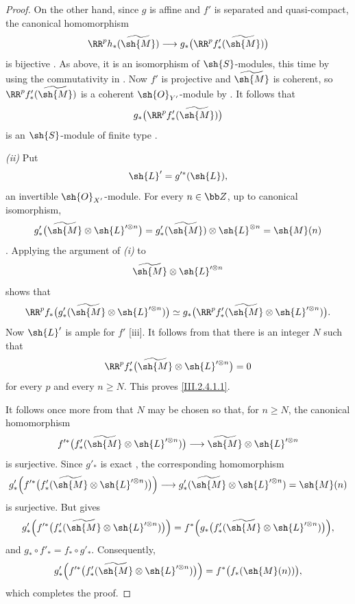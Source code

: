 \begin{proof}
On the other hand, since $g$ is affine and $f'$ is separated and quasi-compact, the canonical homomorphism
\[
  \RR^p h_*(\widetilde{\sh{M}})
  \longrightarrow
  g_*\bigl(\RR^p f'_*(\widetilde{\sh{M}})\bigr)
\]
is bijective .
As above, it is an isomorphism of $\sh{S}$-modules, this time by using the commutativity in .
Now $f'$ is projective and $\widetilde{\sh{M}}$ is coherent, so $\RR^p f'_*(\widetilde{\sh{M}})$ is a coherent $\sh{O}_{Y'}$-module by .
It follows that
\[
  g_*\bigl(\RR^p f'_*(\widetilde{\sh{M}})\bigr)
\]
is an $\sh{S}$-module of finite type .

\emph{(ii)} Put
\[
  \sh{L}'=g'^*(\sh{L}),
\]
an invertible $\sh{O}_{X'}$-module.
For every $n\in\bb Z$, up to canonical isomorphism,
\[
  g'_*\bigl(\widetilde{\sh{M}}\otimes\sh{L}'^{\otimes n}\bigr)
  =
  g'_*(\widetilde{\sh{M}})\otimes\sh{L}^{\otimes n}
  =
  \sh{M}(n)
\]
.
Applying the argument of \emph{(i)} to
\[
  \widetilde{\sh{M}}\otimes\sh{L}'^{\otimes n}
\]
shows that
\[
  \RR^p f_*
  \bigl(g'_*(\widetilde{\sh{M}}\otimes\sh{L}'^{\otimes n})\bigr)
  \simeq
  g_*\bigl(\RR^p f'_*
  (\widetilde{\sh{M}}\otimes\sh{L}'^{\otimes n})\bigr).
\]
Now $\sh{L}'$ is ample for $f'$ [iii].
It follows from  that there is an integer $N$ such that
\[
  \RR^p f'_*
  \bigl(\widetilde{\sh{M}}\otimes\sh{L}'^{\otimes n}\bigr)=0
\]
for every $p$ and every $n\geq N$.
This proves \eqref{III.2.4.1.1}.

It follows once more from  that $N$ may be chosen so that, for $n\geq N$, the canonical homomorphism
\[
  f'^*\bigl(f'_*(\widetilde{\sh{M}}\otimes\sh{L}'^{\otimes n})\bigr)
  \longrightarrow
  \widetilde{\sh{M}}\otimes\sh{L}'^{\otimes n}
\]
is surjective.
Since $g'_*$ is exact , the corresponding homomorphism
\[
  g'_*\Bigl(
    f'^*\bigl(f'_*(\widetilde{\sh{M}}\otimes\sh{L}'^{\otimes n})\bigr)
  \Bigr)
  \longrightarrow
  g'_*(\widetilde{\sh{M}}\otimes\sh{L}'^{\otimes n})
  =\sh{M}(n)
\]
is surjective.
But  gives
\[
  g'_*\Bigl(
    f'^*\bigl(f'_*(\widetilde{\sh{M}}\otimes\sh{L}'^{\otimes n})\bigr)
  \Bigr)
  =
  f^*\Bigl(
    g_*\bigl(f'_*(\widetilde{\sh{M}}\otimes\sh{L}'^{\otimes n})\bigr)
  \Bigr),
\]
and $g_*\circ f'_*=f_*\circ g'_*$.
Consequently,
\[
  g'_*\Bigl(
    f'^*\bigl(f'_*(\widetilde{\sh{M}}\otimes\sh{L}'^{\otimes n})\bigr)
  \Bigr)
  =
  f^*\bigl(f_*(\sh{M}(n))\bigr),
\]
which completes the proof.
\end{proof}

